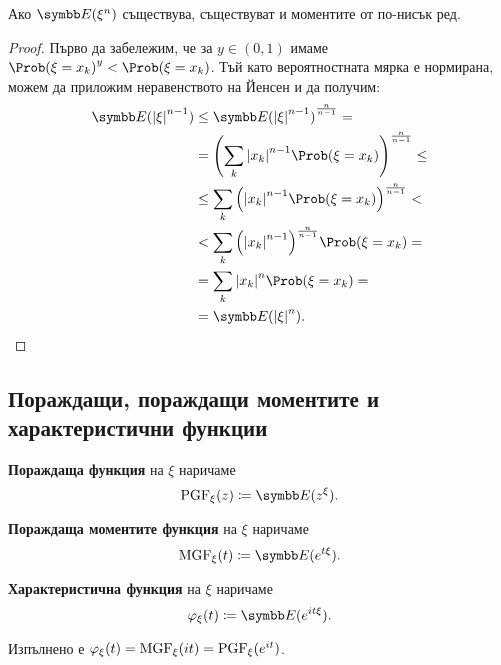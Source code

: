 \documentclass[numbers=endperiod, bibliography=totocnumbered]{scrartcl}
\begin{document}
\begin{proposition}\label{thm:lower_order_moments_exist}
  Ако \( \Expect(\xi^n) \) съществува, съществуват и моментите от по-нисък ред.
\end{proposition}
\begin{proof}
  Първо да забележим, че за \( y \in (0, 1) \) имаме \( {\Prob(\xi = x_k)}^y < \Prob(\xi = x_k) \). Тъй като вероятностната мярка е нормирана, можем да приложим неравенството на Йенсен и да получим:
  \begin{align*}
    \Expect({\Abs{\xi}}^{n-1})
    &\leq
    {\Expect({\Abs{\xi}}^{n-1})}^{\frac n {n-1}}
    = \\ &=
    {\left( \sum_k {\Abs{x_k}}^{n-1} \Prob(\xi = x_k) \right)}^{\frac n {n-1}}
    \leq \\ &\leq
    \sum_k {\left({\Abs{x_k}}^{n-1} \Prob(\xi = x_k) \right)}^{\frac n {n-1}}
    < \\ &<
    \sum_k {\left({\Abs{x_k}}^{n-1}\right)}^{\frac n {n-1}} \Prob(\xi = x_k)
    = \\ &=
    \sum_k {\Abs{x_k}}^n \Prob(\xi = x_k)
    = \\ &=
    \Expect({\Abs{\xi}}^n).
  \end{align*}
\end{proof}

\subsection{Пораждащи, пораждащи моментите и характеристични функции}

\begin{definition}
  \textbf{Пораждаща функция} на \( \xi \) наричаме
  \begin{equation*}
    \PGF_\xi (z) \coloneqq \Expect(z^\xi).
  \end{equation*}

  \textbf{Пораждаща моментите функция} на \( \xi \) наричаме
  \begin{equation*}
    \MGF_\xi (t) \coloneqq \Expect(e^{t\xi}).
  \end{equation*}

  \textbf{Характеристична функция} на \( \xi \) наричаме
  \begin{equation*}
    \Char_\xi (t) \coloneqq \Expect(e^{it\xi}).
  \end{equation*}

  Изпълнено е \( \varphi_\xi(t) = \operatorname{MGF}_\xi(it) = \operatorname{PGF}_\xi(e^{it}) \).
\end{definition}
\end{document}

